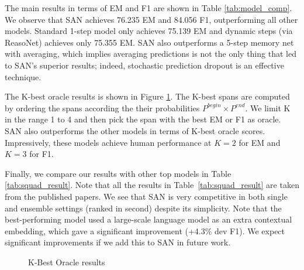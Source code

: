 \documentclass[11pt,a4paper]{article}
\begin{document}
The main results in terms of EM and F1 are shown in  Table \ref{tab:model_comp}. 
We observe that SAN achieves 76.235 EM and 84.056 F1, outperforming all other models. 
Standard 1-step model only achieves 75.139 EM and dynamic steps (via ReasoNet) achieves only 75.355 EM. SAN also outperforms a 5-step memory net with averaging, which implies averaging predictions is not the only thing that led to SAN's superior results; 
indeed, stochastic prediction dropout is an effective technique.

The K-best oracle results is shown in Figure \ref{fig:sys_vs_hum}. 
The K-best spans are computed by ordering the spans according the their probabilities $P^{begin} \times P^{end}$.
We limit K in the range 1 to 4 and then pick the span with the best EM or F1 as oracle. 
SAN also outperforms the other models in terms of K-best oracle scores. Impressively, these models achieve human performance at $K=2$ for EM and $K=3$ for F1.

Finally, we compare our results with other top models in Table \ref{tab:squad_result}. Note that all the results in Table~\ref{tab:squad_result} are taken from the published papers. 
We see that SAN is very competitive in both single and ensemble settings (ranked in second) despite its simplicity. Note that the best-performing model \cite{2018arXiv180205365P} used a large-scale language model as an extra contextual embedding, which gave a significant improvement (+4.3\% dev F1). We expect significant improvements if we add this to SAN in future work.


\begin{figure}[t]
\centering  
{}
\caption{\label{fig:sys_vs_hum} K-Best Oracle results}
\end{figure}
\end{document}
